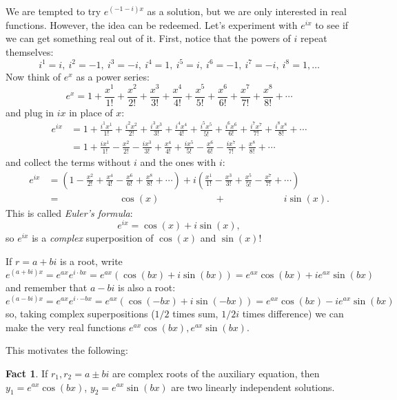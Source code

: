 \documentclass[12pt]{amsart}
\numberwithin{equation}{section}
\theoremstyle{plain} %
\theoremstyle{definition}
\newtheorem{fact}[equation]{Fact}
\theoremstyle{remark}
\begin{document}
We are tempted to try $e^{(-1-i)x}$ as a solution, but we are only interested in real functions. However, the idea can be redeemed. Let's experiment with $e^{ix}$ to see if we can get something real out of it. First, notice that the powers of $i$ repeat themselves:
\[  i^1=i,\ i^2 = -1,\ i^3=-i,\ i^4=1,\ i^5=i,\ i^6=-1,\ i^7=-i,\ i^8 = 1, \dots\]
Now think of $e^{x}$ as a power series:
\[ e^x = 1 + \frac{x^1}{1!} + \frac{x^2}{2!} + \frac{x^3}{3!} + \frac{x^4}{4!} + \frac{x^5}{5!} + \frac{x^6}{6!} +\frac{x^7}{7!} + \frac{x^8}{8!} + \cdots\]
and plug in $ix$ in place of $x$:
\[ \begin{aligned}
e^{ix} &= 1 + \frac{i^1 x^1}{1!} + \frac{i^2 x^2}{2!} + \frac{i^3 x^3}{3!} + \frac{i^4 x^4}{4!} + \frac{i^5 x^5}{5!} + \frac{i^6 x^6}{6!} +\frac{i^7 x^7}{7!} + \frac{i^8 x^8}{8!} + \cdots\\
&= 1 + \frac{i x^1}{1!} - \frac{x^2}{2!} - \frac{i x^3}{3!} + \frac{x^4}{4!} + \frac{i x^5}{5!} - \frac{x^6}{6!} -\frac{i x^7}{7!} + \frac{x^8}{8!} + \cdots
\end{aligned}\]
and collect the terms without $i$ and the ones with $i$:
\[ \begin{aligned}
e^{ix} &= \left(1  - \frac{x^2}{2!} + \frac{x^4}{4!}  - \frac{x^6}{6!} + \frac{x^8}{8!} + \cdots\right) + i \left( \frac{x^1}{1!} - \frac{x^3}{3!} + \frac{x^5}{5!}-\frac{x^7}{7!} + \cdots\right)\\
&= \qquad \qquad\qquad\cos(x) \qquad\qquad\quad \,\, \,\, + \qquad\qquad\qquad i \sin(x).
\end{aligned}\]
This is called \emph{Euler's formula}:
\[ e^{ix} = \cos(x) + i \sin(x),\]
so $e^{ix}$ is a \emph{complex} superposition of $\cos(x)$ and $\sin(x)$!

If $r=a+bi$ is a root, write
\[e^{(a+bi)x} = e^{ax} e^{i \cdot bx} = e^{ax} (\cos(bx) + i \sin(bx))= e^{ax} \cos(bx) + i  e^{ax} \sin(bx)\]
and remember that $a-bi$ is also a root:
\[e^{(a-bi)x} = e^{ax} e^{i \cdot -bx} = e^{ax} (\cos(-bx) + i \sin(-bx))=  e^{ax} \cos(bx) - i  e^{ax} \sin(bx)\]
so, taking complex superpositions ($1/2$ times sum, $1/2i$ times difference) we can make the very real functions $e^{ax} \cos(bx), e^{ax} \sin(bx)$.


This motivates the following:

\begin{fact}
If $r_1, r_2 = a \pm bi$ are complex roots of the auxiliary equation, then $y_1 = e^{ax} \cos(bx)$, $y_2= e^{ax} \sin(bx)$ are two linearly independent solutions.
\end{fact}
\end{document}
